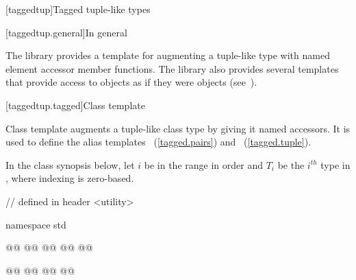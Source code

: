{\color{addclr}
[taggedtup]{Tagged tuple-like types}

[taggedtup.general]{In general}

\pnum The library provides a template for augmenting a tuple-like type with named element accessor
member functions. The library also provides several templates that provide access to 
objects as if they were  objects (see~).


[taggedtup.tagged]{Class template }

\pnum
Class template  augments a tuple-like class type by giving it named accessors. It is
used to define the alias templates ~(\ref{tagged.pairs}) and
~(\ref{tagged.tuple}).

\pnum In the class synopsis below, let $i$ be in the range
 in order and $T_i$ be the $i^{th}$ type in , where indexing
is zero-based.

%
\begin{codeblock}
// defined in header <utility>

namespace std { @@
  @@
  @@
    @@
  @\newtxt{\}}@

  @@
  @@
    @@
  @\newtxt{\}}@

}
\end{codeblock}}
